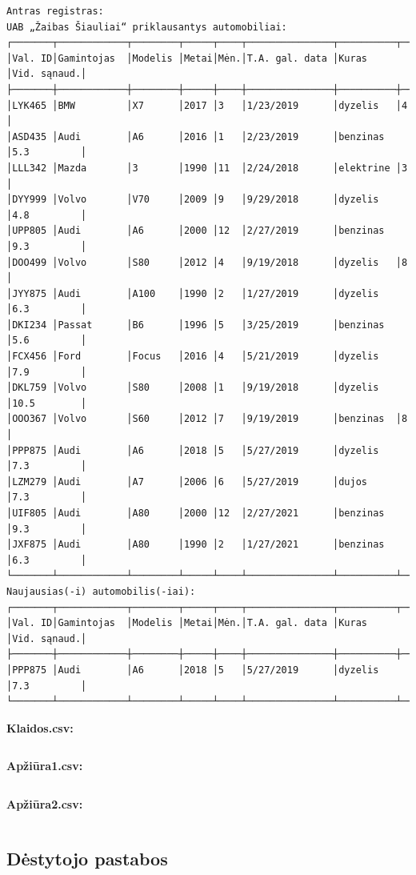 \documentclass{article}
\begin{document}
\begin{verbatim}
Antras registras:
UAB „Žaibas Šiauliai“ priklausantys automobiliai:
┌───────┬────────────┬────────┬─────┬────┬───────────────┬──────────┬────────────┐
│Val. ID│Gamintojas  │Modelis │Metai│Mėn.│T.A. gal. data │Kuras     │Vid. sąnaud.│
├───────┼────────────┼────────┼─────┼────┼───────────────┼──────────┼────────────┤
│LYK465 │BMW         │X7      │2017 │3   │1/23/2019      │dyzelis   │4           │
│ASD435 │Audi        │A6      │2016 │1   │2/23/2019      │benzinas  │5.3         │
│LLL342 │Mazda       │3       │1990 │11  │2/24/2018      │elektrine │3           │
│DYY999 │Volvo       │V70     │2009 │9   │9/29/2018      │dyzelis   │4.8         │
│UPP805 │Audi        │A6      │2000 │12  │2/27/2019      │benzinas  │9.3         │
│DOO499 │Volvo       │S80     │2012 │4   │9/19/2018      │dyzelis   │8           │
│JYY875 │Audi        │A100    │1990 │2   │1/27/2019      │dyzelis   │6.3         │
│DKI234 │Passat      │B6      │1996 │5   │3/25/2019      │benzinas  │5.6         │
│FCX456 │Ford        │Focus   │2016 │4   │5/21/2019      │dyzelis   │7.9         │
│DKL759 │Volvo       │S80     │2008 │1   │9/19/2018      │dyzelis   │10.5        │
│OOO367 │Volvo       │S60     │2012 │7   │9/19/2019      │benzinas  │8           │
│PPP875 │Audi        │A6      │2018 │5   │5/27/2019      │dyzelis   │7.3         │
│LZM279 │Audi        │A7      │2006 │6   │5/27/2019      │dujos     │7.3         │
│UIF805 │Audi        │A80     │2000 │12  │2/27/2021      │benzinas  │9.3         │
│JXF875 │Audi        │A80     │1990 │2   │1/27/2021      │benzinas  │6.3         │
└───────┴────────────┴────────┴─────┴────┴───────────────┴──────────┴────────────┘
Naujausias(-i) automobilis(-iai):
┌───────┬────────────┬────────┬─────┬────┬───────────────┬──────────┬────────────┐
│Val. ID│Gamintojas  │Modelis │Metai│Mėn.│T.A. gal. data │Kuras     │Vid. sąnaud.│
├───────┼────────────┼────────┼─────┼────┼───────────────┼──────────┼────────────┤
│PPP875 │Audi        │A6      │2018 │5   │5/27/2019      │dyzelis   │7.3         │
└───────┴────────────┴────────┴─────┴────┴───────────────┴──────────┴────────────┘
\end{verbatim}
\normalsize

\pagebreak

\textbf{Klaidos.csv:}
\inputminted{csharp}{Assets/L3/klaidos2.csv}

\textbf{Apžiūra1.csv:}
\inputminted{csharp}{Assets/L3/apziura2-1.csv}

\textbf{Apžiūra2.csv:}
\inputminted{csharp}{Assets/L3/apziura2-2.csv}

\subsection{Dėstytojo pastabos}
\newpage
\end{document}
